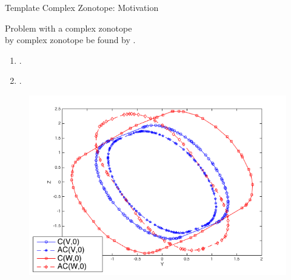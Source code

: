 
\begin{frame}{Template Complex Zonotope: Motivation}

Problem with  a        complex zonotope\\[1em]

\negemph{*}  by complex
zonotope  be found by .
%
\begin{enumerate}
\item {}.
\item {}.
\end{enumerate}
%
\begin{figure}
\center
\includegraphics[scale=0.3]{figures/CZtopes/refinement.png}
\end{figure}
%
\end{frame}



